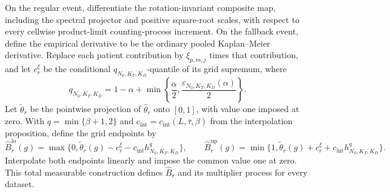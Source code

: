 On the regular event, differentiate the rotation-invariant composite map, including the spectral projector and positive square-root scales, with respect to every cellwise product-limit counting-process increment.  On the fallback event, define the empirical derivative to be the ordinary pooled Kaplan--Meier derivative.  Replace each patient contribution by \(\xi_{p,m,j}\) times that contribution, and let \(c_r^\xi\) be the conditional \(q_{N_0,K_T,K_D}\)-quantile of its grid supremum, where
\[
 q_{N_0,K_T,K_D}=1-\alpha+
 \min\left\{\frac{\alpha}{2},\frac{\varepsilon_{N_0,K_T,K_D}(\alpha)}{2}\right\}.
\]
Let \(\widetilde\theta_r\) be the pointwise projection of \(\widehat\theta_r\) onto \([0,1]\), with value one imposed at zero.  With \(q=\min\{\beta+1,2\}\) and \(c_{\mathrm{int}}=c_{\mathrm{int}}(L,\bar\tau,\beta)\) from the interpolation proposition, define the grid endpoints by
\[
 \widehat B_r^{\mathrm{lo}}(g)=\max\{0,\widetilde\theta_r(g)-c_r^\xi-c_{\mathrm{int}}h_{N_0,K_T,K_D}^{q}\},
 \qquad
 \widehat B_r^{\mathrm{up}}(g)=\min\{1,\widetilde\theta_r(g)+c_r^\xi+c_{\mathrm{int}}h_{N_0,K_T,K_D}^{q}\}.
\]
Interpolate both endpoints linearly and impose the common value one at zero.  This total measurable construction defines \(\widehat B_r\) and its multiplier process for every dataset.
